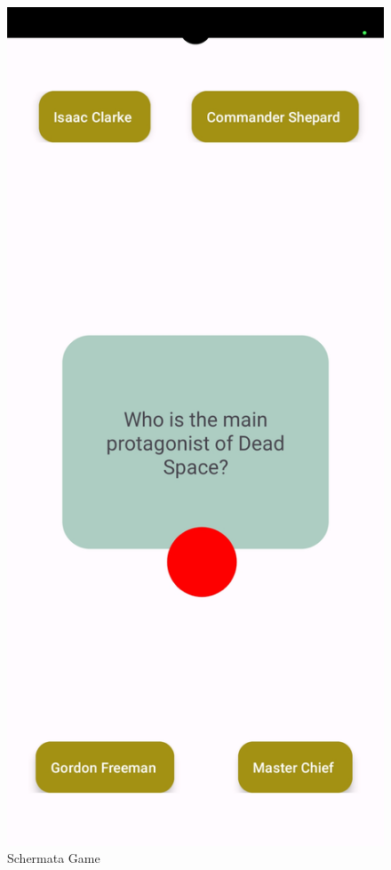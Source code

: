 \documentclass[11pt]{article}
\begin{document}
\begin{figure}[h]
	\centering
	\caption{Schermata Game}
	\includegraphics[scale=0.2]{img/CameraApp_Screen_quiz.jpg}
\end{figure}
\end{document}
